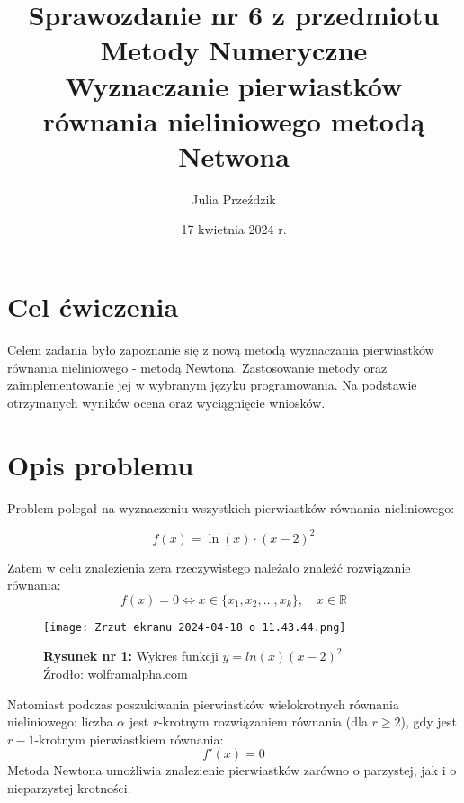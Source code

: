 \documentclass{article}
\begin{document}
\Large

\title{\LARGE Sprawozdanie nr 6 z przedmiotu Metody Numeryczne\\
       \LARGE Wyznaczanie pierwiastków równania nieliniowego metodą Netwona}
\author{Julia Przeździk}
\date{17 kwietnia 2024 r.}
\maketitle

\large

\section{Cel ćwiczenia}
Celem zadania było zapoznanie się z nową metodą wyznaczania pierwiastków równania nieliniowego - metodą Newtona. Zastosowanie metody oraz zaimplementowanie jej w wybranym języku programowania. Na podstawie otrzymanych wyników ocena oraz wyciągnięcie wniosków.

\section{Opis problemu}
Problem polegał na wyznaczeniu wszystkich pierwiastków równania nieliniowego:

\begin{equation*}
f(x) = \ln(x) \cdot (x - 2)^2
\end{equation*}

\noindent
Zatem w celu znalezienia zera rzeczywistego należało znaleźć rozwiązanie równania:
\begin{equation*}
    f(x) = 0 \iff x \in \{x_1, x_2, \ldots, x_k\}, \quad x \in \mathbb{R}
\end{equation*}

\begin{figure}[h]
    \centering
    \texttt{[image: Zrzut ekranu 2024-04-18 o 11.43.44.png]}
    \caption{\textbf{Rysunek nr 1:} Wykres funkcji $y = ln(x)(x-2)^2$ \\ \small{Źrodło: wolframalpha.com}}
    \label{fig:enter-label}
\end{figure}

\noindent
Natomiast podczas poszukiwania pierwiastków wielokrotnych równania nieliniowego: liczba $\alpha$ jest $r$-krotnym rozwiązaniem równania (dla $r \geq 2 $), gdy jest $r-1$-krotnym pierwiastkiem równania:
\begin{equation*}
    f'(x) = 0
\end{equation*}
Metoda Newtona umożliwia znalezienie pierwiastków zarówno o parzystej, jak i o nieparzystej krotności.
\end{document}
